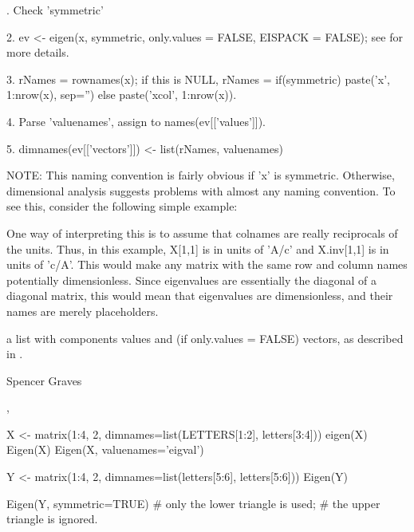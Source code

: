 \begin{Details}.  Check 'symmetric'  

2.  ev <- eigen(x, symmetric, only.values = FALSE, EISPACK = FALSE);
see  for more details.  

3.  rNames = rownames(x);  if this is NULL, rNames = if(symmetric)
paste('x', 1:nrow(x), sep='') else paste('xcol', 1:nrow(x)).  

4.  Parse 'valuenames', assign to names(ev[['values']]).  

5.  dimnames(ev[['vectors']]) <- list(rNames, valuenames) 

NOTE:  This naming convention is fairly obvious if 'x' is symmetric.
Otherwise, dimensional analysis suggests problems with almost any
naming convention.  To see this, consider the following simple
example:


One way of interpreting this is to assume that colnames are really
reciprocals of the units.  Thus, in this example, X[1,1] is in units
of 'A/c' and X.inv[1,1] is in units of 'c/A'.  This would make any
matrix with the same row and column names potentially dimensionless.
Since eigenvalues are essentially the diagonal of a diagonal matrix,
this would mean that eigenvalues are dimensionless, and their names
are merely placeholders.
\end{Details}
\begin{Value}
a list with components values and (if only.values = FALSE)
vectors, as described in .
\end{Value}
\begin{Author}\relax
Spencer Graves
\end{Author}
\begin{SeeAlso}\relax
{},
\end{SeeAlso}
\begin{Examples}
\begin{ExampleCode}
X <- matrix(1:4, 2, dimnames=list(LETTERS[1:2], letters[3:4]))
eigen(X)
Eigen(X)
Eigen(X, valuenames='eigval')

Y <- matrix(1:4, 2, dimnames=list(letters[5:6], letters[5:6]))
Eigen(Y)

Eigen(Y, symmetric=TRUE)
# only the lower triangle is used;
# the upper triangle is ignored.  
\end{ExampleCode}
\end{Examples}

